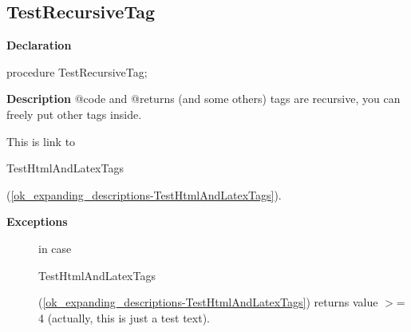 \documentclass{report}
\begin{document}
\subsection*{TestRecursiveTag}
\begin{list}{}{
\setlength{\itemindent}{0cm}
\setlength{\listparindent}{0cm}
\setlength{\leftmargin}{\evensidemargin}
\addtolength{\leftmargin}{\tmplength}
\settowidth{\labelsep}{X}
\addtolength{\leftmargin}{\labelsep}
\setlength{\labelwidth}{\tmplength}
}
\begin{flushleft}
\item[\textbf{Declaration}\hfill]
\begin{ttfamily}
procedure TestRecursiveTag;\end{ttfamily}


\end{flushleft}
\par
\item[\textbf{Description}]
@code and @returns (and some others) tags are recursive, you can freely put other tags inside.

\begin{ttfamily}This is link to \begin{ttfamily}TestHtmlAndLatexTags\end{ttfamily}(\ref{ok_expanding_descriptions-TestHtmlAndLatexTags}).\end{ttfamily}

\par
\item[\textbf{Exceptions}]
\begin{description}
\item[\begin{ttfamily}EFoo\end{ttfamily}(\ref{ok_expanding_descriptions.EFoo})] in case \begin{ttfamily}TestHtmlAndLatexTags\end{ttfamily}(\ref{ok_expanding_descriptions-TestHtmlAndLatexTags}) returns value {$>$}= 4 (actually, this is just a test text).
\end{description}


\end{list}
\end{document}
